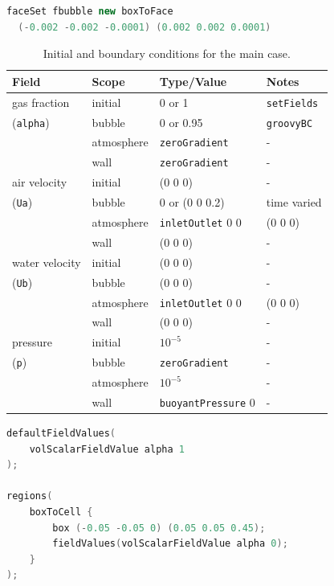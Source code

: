 \documentclass[11pt, a4paper, twoside]{article}
\begin{document}
\begin{lstlisting}[language=C++, caption={\texttt{makeFaceSet.setSet} file to select the inlet cells.}, label={lst:makeFaceSet.setSet}]
faceSet fbubble new boxToFace 
  (-0.002 -0.002 -0.0001) (0.002 0.002 0.0001)
\end{lstlisting}

\begin{table}
\centering
\begin{tabulary}{\linewidth}{L|lll}
\hline
\textbf{Field} & \textbf{Scope} & \textbf{Type/Value} & \textbf{Notes}\\
\hline
    gas fraction & initial & 0 or 1 & \texttt{setFields}\\ 
    (\texttt{alpha}) & bubble & 0 or 0.95 & \texttt{groovyBC}\\
                     & atmosphere & \texttt{zeroGradient} & -\\
                     & wall   & \texttt{zeroGradient} & -\\
    \hline
    air velocity  & initial & (0 0 0) & -\\
    (\texttt{Ua}) & bubble & 0 or (0 0 0.2) & time varied\\
                  & atmosphere & \texttt{inletOutlet} 0 0 & (0 0 0)\\
                  & wall & (0 0 0) & -\\
    \hline
    water velocity& initial & (0 0 0) & -\\
    (\texttt{Ub}) & bubble & (0 0 0) & -\\
                  & atmosphere & \texttt{inletOutlet} 0 0 & (0 0 0)\\
                  & wall & (0 0 0) & -\\
    \hline
    pressure      & initial & $10^{-5}$ & -\\
    (\texttt{p})  & bubble & \texttt{zeroGradient} & -\\
                  & atmosphere & $10^{-5}$ & -\\
                  & wall & \texttt{buoyantPressure} 0 & -\\
\hline
\end{tabulary}
\caption{Initial and boundary conditions for the main case.}
\label{tab:bc_main}
\end{table}

\begin{lstlisting}[language=C++, caption={\texttt{setFieldsDict} file to partially fill the column.}, label={lst:setFieldsDict}]
defaultFieldValues(
    volScalarFieldValue alpha 1
);

regions(
    boxToCell {
        box (-0.05 -0.05 0) (0.05 0.05 0.45);
        fieldValues(volScalarFieldValue alpha 0);
    }
);
\end{lstlisting}
\end{document}
